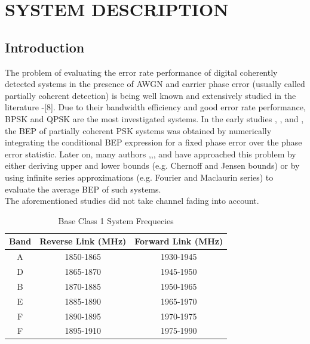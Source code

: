 \chapter{SYSTEM DESCRIPTION}
       \section{Introduction}
The problem of evaluating the error rate performance of digital
coherently detected systems in the presence of AWGN and carrier
phase error (usually called partially coherent detection) is being
well known and extensively studied in the literature
\cite{schwartz:1966}-[8]. Due to their bandwidth efficiency and
good error rate performance, BPSK and QPSK are the most
investigated systems. In the early studies \cite{schwartz:1966},
\cite{viterbi:1966}, and \cite{lindsey:1973}, the BEP of partially
coherent PSK systems was obtained by numerically integrating the
conditional BEP expression for a fixed phase error over the phase
error statistic. Later on, many authors
\cite{prabhu:mar76},\cite{najib:98},\cite{kaplan:90},\cite{kam:93}
and \cite{some:95} have approached this problem by either deriving
upper and lower bounds (e.g. Chernoff and Jensen bounds) or by
using infinite series approximations (e.g. Fourier and Maclaurin
series) to evaluate the average BEP of such systems.\\

The aforementioned studies did not take channel fading into
account.

\begin{table}[htbp]

  \centering

  \caption{Base Class 1 System Frequecies}

\begin{tabular}{|c|c|c|}

\hline

Band&Reverse Link (MHz)&Forward Link (MHz)\\

\hline

A&1850-1865&1930-1945 \\

\hline

D&1865-1870&1945-1950 \\

\hline

B&1870-1885&1950-1965 \\

\hline

E&1885-1890&1965-1970 \\

\hline

F&1890-1895&1970-1975 \\

\hline

F&1895-1910&1975-1990 \\

\hline

\end{tabular}

  \label{tableintro:2}

\end{table}

